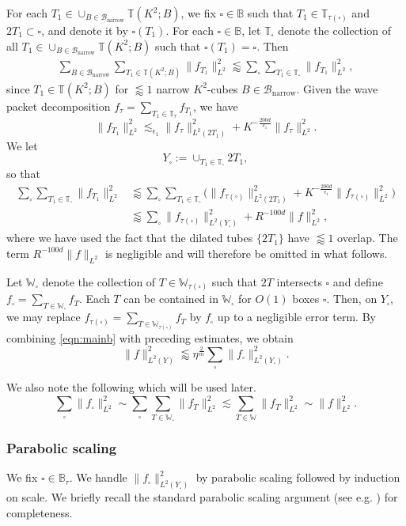 \documentclass[11pt]{amsart}
\theoremstyle{definition}
\theoremstyle{remark}
\numberwithin{equation}{section}
\newcommand{\bB}{\mathbb{B}}
\newcommand{\W}{\mathbb{W}}
\newcommand{\T}{\mathbb{T}}
\newcommand{\sq}{\square}
\newcommand{\Bn}{\mathcal{B}_{\operatorname{narrow}}}
\newcommand{\les}{\lesssim}
\newcommand{\less}{\lessapprox}
\newcommand{\eps}{\epsilon}
\begin{document}
For each $T_1 \in  \cup_{B\in \Bn} \T(K^2;B)$, we fix $\sq\in \bB$ such that $T_1 \in \T_{\tau(\sq)}$ and  $2T_1\subset \sq$, and denote it by $\sq(T_1)$.
For each $\sq\in \bB$, let $\T_\sq$ denote the collection of all $T_1 \in \cup_{B\in \Bn} \T(K^2;B)$ such that $\sq(T_1) = \sq$. Then 
\begin{align*}
	\sum_{B\in \Bn} \sum_{T_1 \in \T(K^2;B)} \|  f_{T_1} \|_{L^2}^2 
	\less \sum_{\sq} \sum_{T_1\in \T_\sq} \| f_{T_1} \|_{L^2}^2, 
\end{align*}
since $T_1 \in \T(K^2;B)$ for $\less 1$ narrow $K^2$-cubes $B\in \Bn$. 
Given the wave packet decomposition $f_\tau = \sum_{T_1\in \T_\tau} f_{T_1}$, we have
\[  \| f_{T_1} \|_{L^2}^2 \les_{\eps_1} \| f_{\tau} \|_{L^2(2T_1)}^2 + K^{-\frac{200d}{\eps_1}} \| f_{\tau} \|_{L^2}^2. \]
We let 
\[ Y_\sq := \cup_{T_1\in \T_\sq} 2T_1,\] 
so that
\begin{align*}
	\sum_{\sq} \sum_{T_1\in \T_\sq} \| f_{T_1} \|_{L^2}^2 &\less   \sum_{\sq} \sum_{T_1\in \T_\sq} \Big(\| f_{\tau(\sq)} \|_{L^2(2T_1)}^2 + K^{-\frac{200d}{\eps_1}} \| f_{\tau(\sq)} \|_{L^2}^2 \Big) \\
	&\less  \sum_{\sq}  \| f_{\tau(\sq)} \|_{L^2(Y_\sq)}^2 +R^{-100d} \| f \|_{L^2}^2,
\end{align*}
where we have used the fact that the dilated tubes $\{ 2T_1\}$ have $\less 1$ overlap. The term $R^{-100d} \| f \|_{L^2}$ is negligible and will therefore be omitted in what follows.

Let $\W_\sq$ denote the collection of $T\in \W_{\tau(\sq)}$ such that $2T$ intersects $\sq$ and define $f_\sq = \sum_{T\in \W_\sq} f_T$. Each $T$ can be contained in $\W_\sq$ for $O(1)$ boxes $\sq$. Then, on $Y_\sq$, we may replace $f_{\tau(\sq)} = \sum_{T\in \W_{\tau(\sq)}} f_T$ by $f_\sq$ up to a negligible error term. By combining \eqref{eqn:mainb} with preceding estimates, we obtain 
\begin{equation}\label{eqn:decK}
	\| f\|_{L^2(Y)}^2 \less \eta^{\frac{2}{m}}\sum_{\sq} \| f_{\sq} \|_{L^2(Y_\sq)}^2.
\end{equation}

We also note the following which will be used later.
\begin{equation}\label{eqn:L2ortho}
	\sum_{\sq} \|  f_\sq \|_{L^2}^2 \sim \sum_{\sq} \sum_{T\in \W_\sq} \|  f_T \|_{L^2}^2 \les \sum_{T\in \W} \| f_T \|_{L^2}^2 \sim \| f\|_{L^2}^2.
\end{equation}

\subsubsection{Parabolic scaling}
We fix $\sq \in \bB_\tau$. We handle $\|  f_{\sq} \|_{L^2(Y_{\sq})}^2$ by parabolic scaling followed by induction on scale. We briefly recall the standard parabolic scaling argument (see e.g. \cite{Guth1}) for completeness. 
\end{document}

